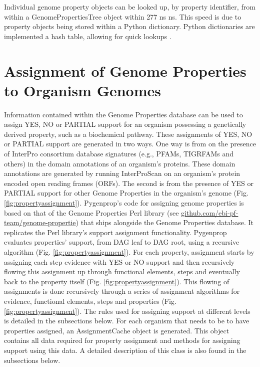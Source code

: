 Individual genome property objects can be looked up, by property identifier, from within a GenomePropertiesTree object within 277 ns  ns. This speed is due to property objects being stored within a Python dictionary. Python dictionaries are implemented a hash table, allowing for quick lookups \cite{van1995python}.

\section{Assignment of Genome Properties to Organism Genomes}

Information contained within the Genome Properties database can be used to assign YES, NO or PARTIAL support for an organism possessing a genetically derived property, such as a biochemical pathway. These assignments of YES, NO or PARTIAL support are generated in two ways. One way is from on the presence of InterPro consortium database signatures (e.g., PFAMs, TIGRFAMs and others) in the domain annotations of an organism's proteins. These domain annotations are generated by running InterProScan \cite{jones2014interproscan} on an organism's protein encoded open reading frames (ORFs). The second is from the presence of YES or PARTIAL support for other Genome Properties in the organism's genome (Fig. \ref{fig:propertyassignment}). Pygenprop's code for assigning genome properties is based on that of the Genome Properties Perl library (see \href{github.com/ebi-pf-team/genome-properties}{github.com/ebi-pf-team/genome-propertie}) that ships alongside the Genome Properties database. It replicates the Perl library's support assignment functionality. Pygenprop evaluates properties' support, from DAG leaf to DAG root, using a recursive algorithm (Fig. \ref{fig:propertyassignment}). For each property, assignment starts by assigning each step evidence with YES or NO support and then recursively flowing this assignment up through functional elements, steps and eventually back to the property itself (Fig. \ref{fig:propertyassignment}). This flowing of assignments is done recursively through a series of assignment algorithms for evidence, functional elements, steps and properties (Fig. \ref{fig:propertyassignment}). The rules used for assigning support at different levels is detailed in the subsections below. For each organism that needs to be to have properties assigned, an AssignmentCache object is generated. This object contains all data required for property assignment and methods for assigning support using this data. A detailed description of this class is also found in the subsections below.

